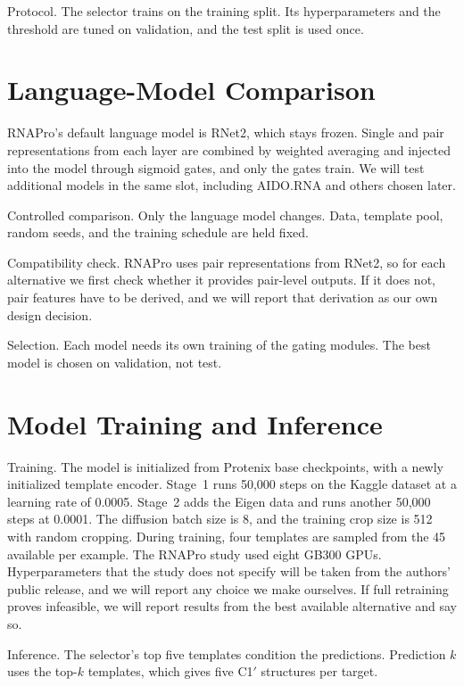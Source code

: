 \documentclass{FastFyp}
\begin{document}
Protocol. The selector trains on the training split. Its hyperparameters and the threshold are tuned on validation, and the test split is used once.

\section{Language-Model Comparison}
RNAPro's default language model is RNet2, which stays frozen. Single and pair representations from each layer are combined by weighted averaging and injected into the model through sigmoid gates, and only the gates train. We will test additional models in the same slot, including AIDO.RNA \cite{zou2024} and others chosen later.

Controlled comparison. Only the language model changes. Data, template pool, random seeds, and the training schedule are held fixed.

Compatibility check. RNAPro uses pair representations from RNet2, so for each alternative we first check whether it provides pair-level outputs. If it does not, pair features have to be derived, and we will report that derivation as our own design decision.

Selection. Each model needs its own training of the gating modules. The best model is chosen on validation, not test.

\section{Model Training and Inference}
Training. The model is initialized from Protenix base checkpoints, with a newly initialized template encoder. Stage~1 runs 50,000 steps on the Kaggle dataset at a learning rate of 0.0005. Stage~2 adds the Eigen data and runs another 50,000 steps at 0.0001. The diffusion batch size is 8, and the training crop size is 512 with random cropping. During training, four templates are sampled from the 45 available per example. The RNAPro study used eight GB300 GPUs. Hyperparameters that the study does not specify will be taken from the authors' public release, and we will report any choice we make ourselves. If full retraining proves infeasible, we will report results from the best available alternative and say so.

Inference. The selector's top five templates condition the predictions. Prediction $k$ uses the top-$k$ templates, which gives five C1$'$ structures per target.
\end{document}
